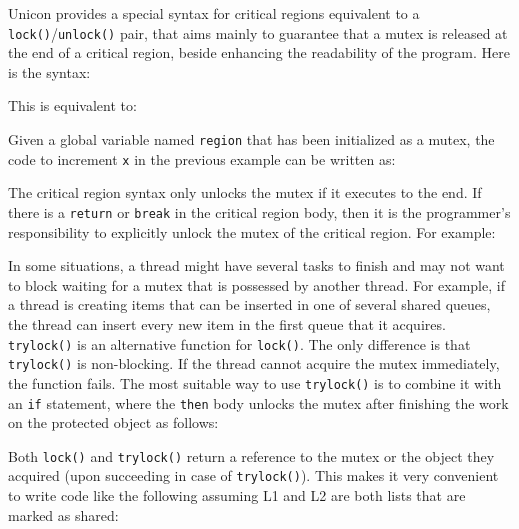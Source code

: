 Unicon provides a special syntax for critical regions
equivalent to a \texttt{lock()}/\texttt{unlock()}
pair, that aims mainly to guarantee that a mutex is released at the end
of a critical region, beside enhancing the readability of the program.
Here is the syntax:


\noindent
This is equivalent to:


Given a global variable named \texttt{region} that has
been initialized as a mutex, the code to increment
\texttt{x} in the previous example can be written as:


The critical region syntax only unlocks the mutex if it executes to
the end. If there is a \texttt{return} or \texttt{break} in the critical region
body, then it is the programmer{\textquoteright}s
responsibility to explicitly unlock the mutex of the critical region.
For example:


In some situations, a thread might have several tasks to finish and may
not want to block waiting for a mutex that is possessed by another
thread. For example, if a thread is creating items that can be inserted
in one of several shared queues, the thread can insert every new item
in the first queue that it acquires. \texttt{trylock()}
is an alternative function for \texttt{lock()}. The
only difference is that \texttt{trylock()} is
non-blocking. If the thread cannot acquire the mutex immediately, the
function fails. The most suitable way to use
\texttt{trylock()} is to combine it with an
\texttt{if} statement, where the
\texttt{then} body unlocks the mutex after finishing
the work on the protected object as follows:


Both \texttt{lock()} and \texttt{trylock()}
return a reference to the mutex or the object they acquired (upon
succeeding in case of \texttt{trylock()}). This makes
it very convenient to write code like the following assuming L1 and L2
are both lists that are marked as shared:

